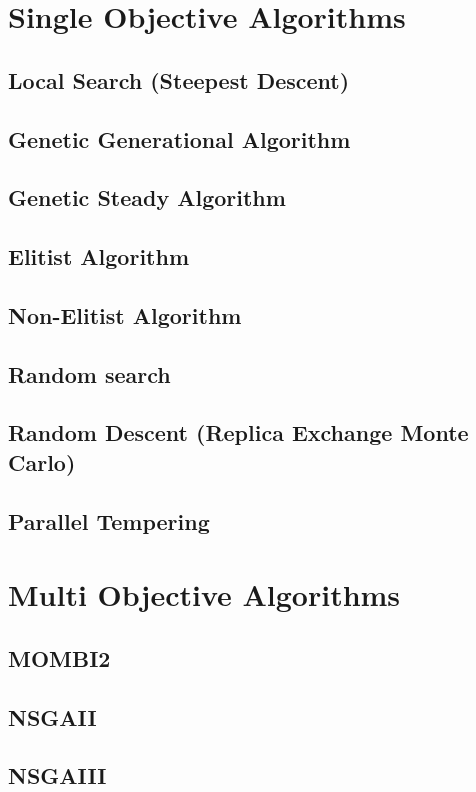 \section{Single Objective Algorithms}

\subsection{Local Search (Steepest Descent)}
\subsection{Genetic Generational Algorithm}
\subsection{Genetic Steady Algorithm}
\subsection{Elitist Algorithm}
\subsection{Non-Elitist Algorithm}

\subsection{Random search} 
\subsection{Random Descent (Replica Exchange Monte Carlo)} 
\subsection{Parallel Tempering} 

\section{Multi Objective Algorithms}

\subsection{MOMBI2}
\subsection{NSGAII}
\subsection{NSGAIII}
